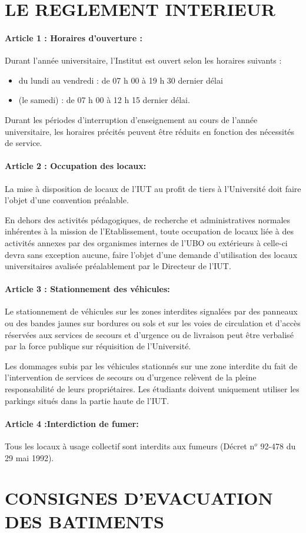 \documentclass[11pt]{article}
\newcommand{\mysection}[1]
{
{
\setlength{\fboxsep}{0cm}
\noindent
\begin{minipage}{\linewidth}
\section{\large \textbf{#1}}
\vspace*{-10pt}
\end{minipage}\vspace*{10pt}
}
}
\begin{document}
\newpage
\mysection{LE REGLEMENT INTERIEUR}
\begin{multicols*}{2}
\paragraph{Article 1 : Horaires d'ouverture :} Durant l'année universitaire, l'Institut est ouvert selon les horaires suivants :
\begin{itemize}
\renewcommand{\labelitemi}{-}
\item du lundi au vendredi : de 07 h 00 à 19 h 30 dernier délai
\item (le samedi) : de 07 h 00 à 12 h 15 dernier délai.
\end{itemize}
Durant les périodes d'interruption d'enseignement au cours de l'année universitaire, les   horaires précités peuvent être réduits en fonction des nécessités de service.

\paragraph{Article 2 : Occupation des locaux: } La mise à disposition de locaux de l'IUT au profit de tiers à l'Université doit faire l'objet d'une convention préalable.

En dehors des activités pédagogiques, de recherche et administratives normales inhérentes à la mission de l'Etablissement, toute occupation de locaux liée à des activités annexes par des organismes internes de l'UBO ou extérieurs à celle-ci devra sans exception aucune, faire l'objet d'une demande d'utilisation des locaux universitaires avalisée préalablement par le Directeur de l'IUT.

\paragraph{Article 3 : Stationnement des véhicules: } Le stationnement de véhicules sur les zones interdites signalées par des panneaux ou des bandes jaunes sur bordures ou sols et sur les voies de circulation et d'accès réservées aux services de secours et d'urgence ou de livraison peut être verbalisé par la force publique sur réquisition de l'Université.

Les dommages subis par les véhicules stationnés sur une zone interdite du fait de l'intervention de services de secours ou d'urgence relèvent de la pleine responsabilité de leurs propriétaires.
Les étudiants doivent uniquement utiliser les parkings situés dans la partie haute de l'IUT.


\paragraph{Article 4 :Interdiction de fumer: } Tous les locaux à usage collectif sont interdits aux fumeurs (Décret n$^{o}$ 92-478 du 29 mai 1992).
\end{multicols*}
\newpage
\mysection{CONSIGNES D'EVACUATION DES BATIMENTS}
\end{document}
